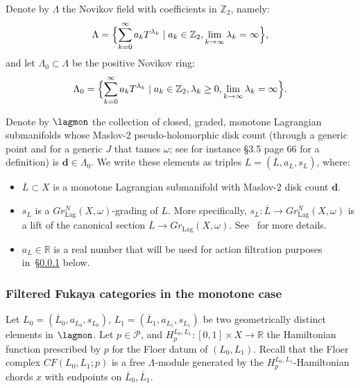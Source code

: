 Denote by $\Lambda$ the Novikov field with coefficients in
$\mathbb{Z}_2$, namely:
\begin{equation} \label{eq:Nov-ring} \Lambda = \Bigl\{
  \sum_{k=0}^{\infty} a_k T^{\lambda_k} \mid a_k \in \mathbb{Z}_2,
  \lim_{k \to \infty} \lambda_k = \infty \Bigr\},
\end{equation}
and let $\Lambda_0 \subset \Lambda$ be the positive Novikov ring:
\begin{equation} \label{eq:Nov-ring-0} \Lambda_0 = \Bigl\{
  \sum_{k=0}^{\infty} a_k T^{\lambda_k} \mid a_k \in \mathbb{Z}_2,
  \lambda_k\geq 0, \lim_{k \to \infty} \lambda_k = \infty \Bigr\}.
\end{equation}

Denote by $\lagmon$ the collection of closed, graded, monotone
Lagrangian submanifolds whose Maslov-$2$ pseudo-holomorphic disk count (through a generic point and for a generic $J$ that tames $\omega$; see for instance \cite{Bi-Co-Sh:LagrSh} \S 3.5 page 66 for a definition) is
$\mathbf{d} \in \Lambda_0$. We write these elements as triples
$L = (\overline{L}, a_L, s_L)$, where:
\begin{itemize}
\item $\overline{L} \subset X$ is a monotone Lagrangian submanifold
  with Maslov-$2$ disk count $\mathbf{d}$.
\item $s_L$ is a $Gr^N_{\text{Lag}}(X, \omega)$-grading of $L$. More
  specifically,
  $s_L: \overline{L} \longrightarrow Gr^N_{\text{Lag}}(X, \omega)$ is
  a lift of the canonical section
  $\overline{L} \longrightarrow Gr_{\text{Lag}}(X,
  \omega)$. See~\cite{Se:graded} for more details.
\item $a_L \in \mathbb{R}$ is a real number that will be used for
  action filtration purposes in~\S\ref{sbsb:fil-mon} below.
\end{itemize}


\subsubsection{Filtered Fukaya categories in the monotone
  case} \label{sbsb:fil-mon} Let
$L_0 = (\overline{L}_0, a_{L_0}, s_{L_0})$,
$L_1 = (\overline{L}_1, a_{L_1}, s_{L_1})$ be two geometrically
distinct elements in $\lagmon$. Let $p \in \mathcal{P}$, and
$H^{L_0,L_1}_p: [0,1] \times X \longrightarrow \mathbb{R}$ the
Hamiltonian function prescribed by $p$ for the Floer datum of
$(L_0, L_1)$. Recall that the Floer complex $CF(L_0, L_1;p)$ is a free
$\Lambda$-module generated by the $H^{L_0,L_1}_p$-Hamiltonian chords
$x$ with endpoints on $\overline{L}_0, \overline{L}_1$.

